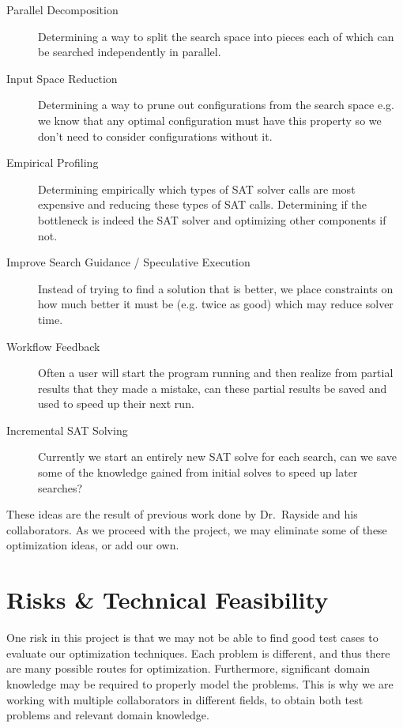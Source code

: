 \documentclass[11pt]{article}
\begin{document}
\begin{description}
  \item[Parallel Decomposition]
      Determining a way to split the search space into pieces each of
      which can be searched independently in parallel.
  \item[Input Space Reduction]
      Determining a way to prune out configurations from the search
      space e.g. we know that any optimal configuration must have this
      property so we don't need to consider configurations without it.
  \item[Empirical Profiling]
      Determining empirically which types of SAT solver calls are most
      expensive and reducing these types of SAT calls. Determining if
      the bottleneck is indeed the SAT solver and optimizing other
      components if not.
  \item[Improve Search Guidance / Speculative Execution]
      Instead of trying to find a solution that is better, we place
      constraints on how much better it must be (e.g. twice as good)
      which may reduce solver time.
  \item[Workflow Feedback]
      Often a user will start the program running and then realize
      from partial results that they made a mistake, can these partial
      results be saved and used to speed up their next run.
  \item[Incremental SAT Solving]
      Currently we start an entirely new SAT solve for each search,
      can we save some of the knowledge gained from initial solves to
      speed up later searches?
\end{description}

These ideas are the result of previous work done by Dr.\ Rayside and
his collaborators. As we proceed with the project, we may eliminate
some of these optimization ideas, or add our own.

\section{Risks \& Technical Feasibility}\label{sec:risks}
One risk in this project is that we may not be able to find good test
cases to evaluate our optimization techniques. Each problem is
different, and thus there are many possible routes for optimization.
Furthermore, significant domain knowledge may be required to properly
model the problems. This is why we are working with multiple
collaborators in different fields, to obtain both test problems and
relevant domain knowledge.
\end{document}
